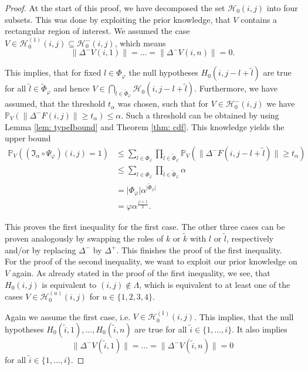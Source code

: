 \documentclass[a4paper,12pt]{article}
\newcommand{\abs}[1]{\lvert#1\rvert}
\newcommand{\norm}[1]{\lVert#1\rVert}
\theoremstyle{plain}
\theoremstyle{definition}
\begin{document}
\begin{proof}
	At the start of this proof, we have decomposed the set $\mathcal{H}_0(i, j)$ into four subsets. This was done by exploiting the prior knowledge, that $V$ contains a rectangular region of interest. We assumed the case $V \in \mathcal{H}_0^{(1)}(i, j) \subseteq \mathcal{H}_0^-(i, j)$, which means
	\begin{equation*}
		\norm{\Delta^- V(i, 1)} = \ldots = \norm{\Delta^- V(i, n)} = 0.
	\end{equation*}
	
	This implies, that for fixed $l \in \Phi_\varphi$ the null hypotheses $H_0(i, j - l + \tilde{l})$ are true for all $\tilde{l} \in \tilde{\Phi}_\varphi$ and hence $V \in \bigcap_{\tilde{l} \in \tilde{\Phi}_\varphi} \mathcal{H}_0(i, j - l + \tilde{l})$. Furthermore, we have assumed, that the threshold $t_\alpha$ was chosen, such that for $V \in \mathcal{H}_0^-(i, j)$ we have $\mathbb{P}_V\left( \norm{\Delta^- F(i, j)} \geq t_\alpha \right) \leq \alpha$. Such a threshold can be obtained by using Lemma \ref{lem: typeIbound} and Theorem \ref{thm: cdf}. This knowledge yields the upper bound
	\begin{align*}
		\mathbb{P}_V\left( (\mathfrak{I}_\alpha \circ \Psi_\varphi)(i, j) = 1 \right) &\leq \sum_{l \in \Phi_\varphi} \prod_{\tilde{l} \in \tilde{\Phi}_\varphi} \mathbb{P}_V\left( \norm{\Delta^- F(i, j - l + \tilde{l})} \geq t_\alpha \right) \\
		&\leq \sum_{l \in \Phi_\varphi} \prod_{\tilde{l} \in \tilde{\Phi}_\varphi} \alpha \\
		&= \abs{\Phi_\varphi} \alpha^{\abs{\tilde{\Phi}_\varphi}} \\
		&= \varphi \alpha^{\frac{\varphi + 1}{2}}.
	\end{align*}
	
	This proves the first inequality for the first case. The other three cases can be proven analogously by swapping the roles of $k$ or $\tilde{k}$ with $l$ or $\tilde{l}$, respectively and/or by replacing $\Delta^-$ by $\Delta^+$. This finishes the proof of the first inequality.\\
	
	
	For the proof of the second inequality, we want to exploit our prior knowledge on $V$ again. As already stated in the proof of the first inequality, we see, that $H_0(i, j)$ is equivalent to $(i, j) \notin \varLambda$, which is equivalent to at least one of the cases $V \in \mathcal{H}_0^{(u)}(i, j)$ for $u \in \{ 1, 2, 3, 4 \}$.
	
	Again we assume the first case, i.e. $V \in \mathcal{H}_0^{(1)}(i, j)$. This implies, that the null hypotheses $H_0(\tilde{i}, 1), \ldots, H_0(\tilde{i}, n)$ are true for all $\tilde{i} \in \{ 1, \dots, i \}$. It also implies
	\begin{equation*}
		\norm{\Delta^- V(\tilde{i}, 1)} = \ldots = \norm{\Delta^- V(\tilde{i}, n)} = 0
	\end{equation*}
	for all $\tilde{i} \in \{ 1, \dots, i \}$.
	

\end{proof}
\end{document}
